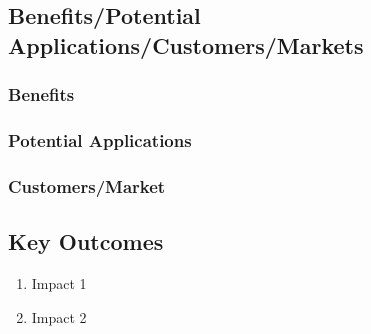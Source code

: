 \subsection{Benefits/Potential Applications/Customers/Markets}
\subsubsection{Benefits}
\subsubsection{Potential Applications}
\subsubsection{Customers/Market}

\subsection{Key Outcomes}
\begin{enumerate}
  \item Impact 1
  \item Impact 2
\end{enumerate}
